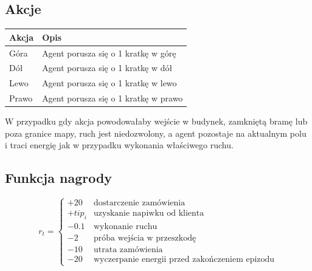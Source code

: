 \documentclass[12pt]{article}
\begin{document}
\subsection{Akcje}
\begin{center}
\begin{tabular}{p{}p{}}
\toprule
Akcja & Opis \\
\midrule
Góra & Agent porusza się o 1 kratkę w górę \\
Dół & Agent porusza się o 1 kratkę w dół \\
Lewo & Agent porusza się o 1 kratkę w lewo \\
Prawo & Agent porusza się o 1 kratkę w prawo \\
\bottomrule
\end{tabular}
\end{center}
W przypadku gdy akcja powodowałaby wejście w budynek, zamkniętą bramę lub poza granice mapy, ruch jest niedozwolony, a agent pozostaje na aktualnym polu i traci energię jak w przypadku wykonania właściwego ruchu.

\subsection{Funkcja nagrody}
\begin{equation}
r_t = \begin{cases}
+20 & \text{dostarczenie zamówienia} \\
+tip_i & \text{uzyskanie napiwku od klienta} \\
-0.1 & \text{wykonanie ruchu} \\
-2 & \text{próba wejścia w przeszkodę} \\
-10 & \text{utrata zamówienia} \\
-20 & \text{wyczerpanie energii przed zakończeniem epizodu}
\end{cases}
\end{equation}
\end{document}
